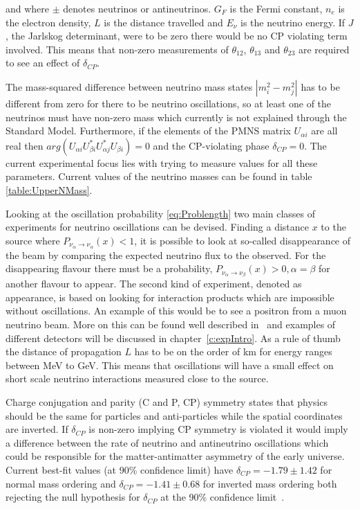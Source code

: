 and where $\pm$ denotes neutrinos or antineutrinos. $G_F$ is the Fermi constant, $n_e$ is the electron density, $L$ is the distance travelled and $E_\nu$ is the neutrino energy. If $J$, the Jarlskog determinant, were to be zero there would be no CP violating term involved. This means that non-zero measurements of $\theta_{12}$, $\theta_{13}$ and $\theta_{23}$ are required to see an effect of $\delta_{CP}$. 

The mass-squared difference between neutrino mass states $\left|m_i^2 - m_j^2\right|$ has to be different from zero for there to be neutrino oscillations, so at least one of the neutrinos must have non-zero mass which currently is not explained through the Standard Model. Furthermore, if the elements of the PMNS matrix $U_{\alpha i}$ are all real then $arg(U_{\alpha i} U^*_{\beta i} U^*_{\alpha j}  U_{\beta i} ) = 0$ and the CP-violating phase $\delta_{CP} =0$. The current experimental focus lies with trying to measure values for all these parameters. Current values of the neutrino masses can be found in table \ref{table:UpperNMass}.

Looking at the oscillation probability \eqref{eq:Problength} two main classes of experiments for neutrino oscillations can be devised. Finding a distance $x$ to the source where $P_{\nu_\alpha \rightarrow \nu_\alpha} (x) < 1$, it is possible to look at so-called disappearance of the beam by comparing the expected neutrino flux to the observed. For the disappearing flavour there must be a probability, $P_{\nu_\alpha \rightarrow \nu_\beta} (x) > 0, \alpha=\beta$ for another flavour to appear. The second kind of experiment, denoted as appearance, is based on looking for interaction products which are impossible without oscillations.  An example of this would be to see a positron from a muon neutrino beam. More on this can be found well described in~\cite{34doi:10.1142/9789812562203_0002} and examples of different detectors will be discussed in chapter~\ref{c:expIntro}. As a rule of thumb the distance of propagation $L$ has to be on the order of km for energy ranges between MeV to GeV. This means that oscillations will have a small effect on short scale neutrino interactions measured close to the source.

Charge conjugation and parity (C and P, CP) symmetry states that physics should be the same for particles and anti-particles while the spatial coordinates are inverted. If $\delta_{CP}$ is non-zero implying CP symmetry is violated it would imply a difference between the rate of neutrino and antineutrino oscillations which could be responsible for the matter-antimatter asymmetry of the early universe. Current best-fit values (at 90\% confidence limit) have $\delta_{CP} = -1.79\pm 1.42$ for normal mass ordering and $\delta_{CP} = -1.41\pm 0.68$ for inverted mass ordering both rejecting the null hypothesis for $\delta_{CP}$ at the 90\% confidence limit~\cite{T2KResults}.


